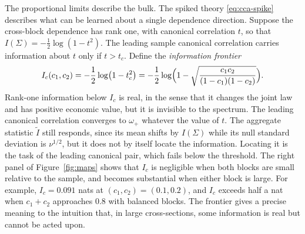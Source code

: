 The proportional limits describe the bulk. The spiked theory \eqref{eq:cca-spike} describes what can be learned about a single dependence direction. Suppose the cross-block dependence has rank one, with canonical correlation $t$, so that $I(\Sigma)=-\tfrac12\log(1-t^2)$. The leading sample canonical correlation carries information about $t$ only if $t>t_c$. Define the \emph{information frontier}
\begin{equation}
 I_c(c_1,c_2)=-\frac12\log\bigl(1-t_c^2\bigr)=-\frac12\log\Bigl(1-\sqrt{\frac{c_1c_2}{(1-c_1)(1-c_2)}}\Bigr).
 \label{eq:frontier}
\end{equation}
Rank-one information below $I_c$ is real, in the sense that it changes the joint law and has positive economic value, but it is invisible to the spectrum. The leading canonical correlation converges to $\omega_+$ whatever the value of $t$. The aggregate statistic $\tilde I$ still responds, since its mean shifts by $I(\Sigma)$ while its null standard deviation is $\nu^{1/2}$, but it does not by itself locate the information. Locating it is the task of the leading canonical pair, which fails below the threshold. The right panel of Figure~\ref{fig:maps} shows that $I_c$ is negligible when both blocks are small relative to the sample, and becomes substantial when either block is large. For example, $I_c=0.091$ nats at $(c_1,c_2)=(0.1,0.2)$, and $I_c$ exceeds half a nat when $c_1+c_2$ approaches $0.8$ with balanced blocks. The frontier gives a precise meaning to the intuition that, in large cross-sections, some information is real but cannot be acted upon.
